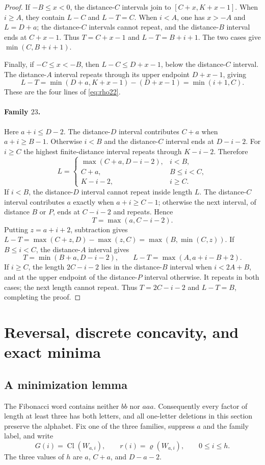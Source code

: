 \documentclass[11pt]{amsart}
\newcommand{\Cl}{\operatorname{Cl}}
\newcommand{\Rho}{\varrho}
\begin{document}
\begin{proof}
If $-B\le x<0$, the distance-$C$ intervals join to
$[C+x,K+x-1]$.  When $i\ge A$, they contain $L-C$ and $L-T=C$.
When $i<A$, one has $x>-A$ and $L=D+a$; the distance-$C$ intervals
cannot repeat, and the distance-$B$ interval ends at $C+x-1$.
Thus $T=C+x-1$ and $L-T=B+i+1$.  The two cases give
$\min(C,B+i+1)$.

Finally, if $-C\le x<-B$, then $L-C\le D+x-1$, below the
 distance-$C$ interval.  The distance-$A$ interval repeats through its
upper endpoint $D+x-1$, giving
\[
 L-T=\min(D+a,K+x-1)-(D+x-1)=\min(i+1,C).
\]
These are the four lines of \eqref{eq:rho22}.

\paragraph{Family $23$.}
Here $a+i\le D-2$.  The distance-$D$ interval contributes $C+a$ when
$a+i\ge B-1$.  Otherwise $i<B$ and the distance-$C$ interval ends at
$D-i-2$.  For $i\ge C$ the highest finite-distance interval repeats
through $K-i-2$.  Therefore
\[
 L=\begin{cases}
 \max(C+a,D-i-2),&i<B,\\
 C+a,&B\le i<C,\\
 K-i-2,&i\ge C.
 \end{cases}
\]
If $i<B$, the distance-$D$ interval cannot repeat inside length $L$.
The distance-$C$ interval contributes $a$ exactly when $a+i\ge C-1$;
otherwise the next interval, of distance $B$ or $P$, ends at $C-i-2$
and repeats.  Hence
\[
 T=\max(a,C-i-2).
\]
Putting $z=a+i+2$, subtraction gives
$L-T=\max(C+z,D)-\max(z,C)=\max(B,\min(C,z))$.
If $B\le i<C$, the distance-$A$ interval gives
\[
 T=\min(B+a,D-i-2),\qquad L-T=\max(A,a+i-B+2).
\]
If $i\ge C$, the length $2C-i-2$ lies in the distance-$B$ interval
when $i<2A+B$, and at the upper endpoint of the distance-$P$ interval
otherwise.  It repeats in both cases; the next length cannot repeat.
Thus $T=2C-i-2$ and $L-T=B$, completing the proof.
\end{proof}

\section{Reversal, discrete concavity, and exact minima}

\subsection{A minimization lemma}
The Fibonacci word contains neither $bb$ nor $aaa$.  Consequently every
factor of length at least three has both letters, and all one-letter
deletions in this section preserve the alphabet.
Fix one of the three families, suppress $a$ and the family label, and write
\[
 G(i)=\Cl(W_{a,i}),\qquad r(i)=\Rho(W_{a,i}),\qquad 0\le i\le h.
\]
The three values of $h$ are $a$, $C+a$, and $D-a-2$.
\end{document}
